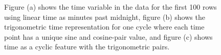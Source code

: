 \begin{figure}[H]
  \centering
  \hfill
  \hfill
  
  \caption[Time as a cyclic feature]{Figure (a) shows the time variable in the data for the first 100 rows using linear time as minutes past midnight, figure (b) shows the trigonometric time representation for one cycle where each time point has a unique sine and cosine-pair value, and figure (c) shows time as a cyclic feature with the trigonometric pairs.}
\label{fig:cyclic}
\end{figure}